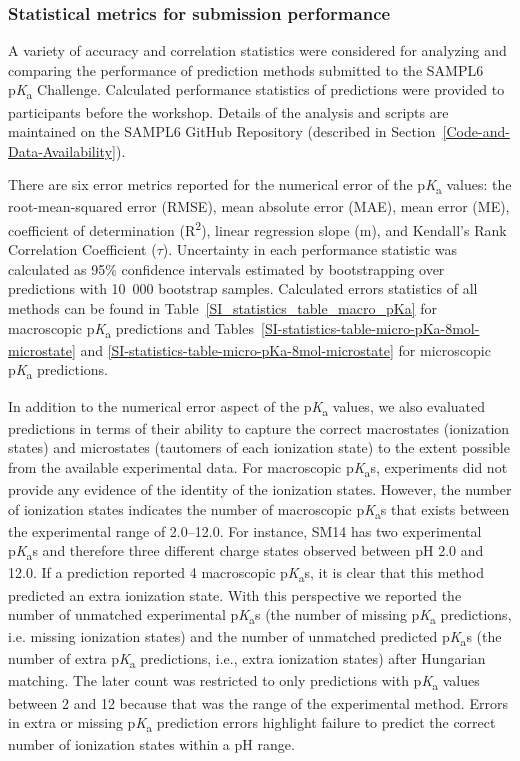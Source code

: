 \documentclass[9pt,lineno,final]{elife}
\newcommand{\pKa}{p\textit{K}\textsubscript{a}}
\begin{document}
\subsubsection{Statistical metrics for submission performance}

A variety of accuracy and correlation statistics were considered for analyzing and comparing the performance of prediction methods submitted to the SAMPL6 \pKa{} Challenge. 
Calculated performance statistics of predictions were provided to participants before the workshop. 
Details of the analysis and scripts are maintained on the SAMPL6 GitHub Repository (described in Section~\ref{Code-and-Data-Availability}).

There are six error metrics reported for the numerical error of the \pKa{} values: the root-mean-squared error (RMSE), mean absolute error (MAE), mean error (ME), coefficient of determination (R\textsuperscript{2}), linear regression slope (m), and Kendall’s Rank Correlation Coefficient ($\tau$).
Uncertainty in each performance statistic was calculated as 95\% confidence intervals estimated by bootstrapping over predictions with 10~000 bootstrap samples. 
Calculated errors statistics of all methods can be found in Table~\ref{SI_statistics_table_macro_pKa} for macroscopic \pKa{} predictions and Tables~\ref{SI-statistics-table-micro-pKa-8mol-microstate} and \ref{SI-statistics-table-micro-pKa-8mol-microstate} for microscopic \pKa{} predictions. 

In addition to the numerical error aspect of the \pKa{} values, we also evaluated predictions in terms of their ability to capture the correct macrostates (ionization states) and microstates (tautomers of each ionization state) to the extent possible from the available experimental data. 
For macroscopic \pKa{}s, experiments did not provide any evidence of the identity of the ionization states. However, the number of ionization states indicates the number of macroscopic \pKa{}s that exists between the experimental range of 2.0--12.0. 
For instance, SM14 has two experimental \pKa{}s and therefore three different charge states observed between pH 2.0 and 12.0. 
If a prediction reported 4 macroscopic \pKa{}s, it is clear that this method predicted an extra ionization state. 
With this perspective we reported the number of unmatched experimental \pKa{}s (the number of missing \pKa{} predictions, i.e. missing ionization states) and the number of unmatched predicted \pKa{}s (the number of extra \pKa{} predictions, i.e., extra ionization states) after Hungarian matching. 
The later count was restricted to only predictions with \pKa{} values between 2 and 12 because that was the range of the experimental method. 
Errors in extra or missing \pKa{} prediction errors highlight failure to predict the correct number of ionization states within a pH range.
\end{document}
